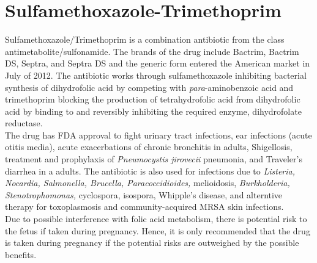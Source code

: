 \section{Sulfamethoxazole-Trimethoprim}
\indent Sulfamethoxazole/Trimethoprim is a combination antibiotic from the class antimetabolite/sulfonamide. The brands of the drug include Bactrim, Bactrim DS, Septra, and Septra DS and the generic form entered the American market in July of 2012. The antibiotic works through sulfamethoxazole inhibiting bacterial synthesis of dihydrofolic acid by competing with \textit{para}-aminobenzoic acid and trimethoprim blocking the production of tetrahydrofolic acid from dihydrofolic acid by binding to and reversibly inhibiting the required enzyme, dihydrofolate reductase.\\
\indent The drug has FDA approval to fight urinary tract infections, ear infections (acute otitis media), acute exacerbations of chronic bronchitis in adults, Shigellosis, treatment and prophylaxis of \textit{Pneumocystis jirovecii} pneumonia, and Traveler's diarrhea in a adults. The antibiotic is also used for infections due to \textit{Listeria, Nocardia, Salmonella, Brucella, Paracoccidioides,} melioidosis, \textit{Burkholderia, Stenotrophomonas,} cyclospora, isospora, Whipple's disease, and alterntive therapy for toxoplasmosis and community-acquired MRSA skin infections.\\
\indent Due to possible interference with folic acid metabolism, there is potential risk to the fetus if taken during pregnancy. Hence, it is only recommended that the drug is taken during pregnancy if the potential risks are outweighed by the possible benefits.\\

